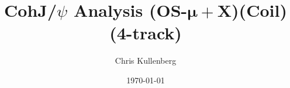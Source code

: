 \title{CohJ/$\psi$ Analysis (\textbf{OS}-$\boldsymbol{\mu+}$\textbf{X})(\textbf{Coil})(\textbf{4-track})}
\author{Chris Kullenberg}
\date{\today}
